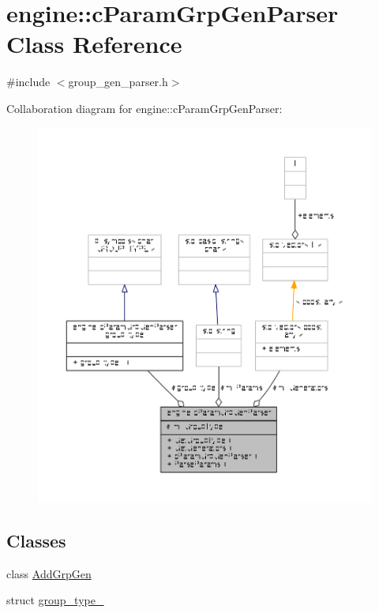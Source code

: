 \hypertarget{classengine_1_1cParamGrpGenParser}{\section{engine\-:\-:c\-Param\-Grp\-Gen\-Parser Class Reference}
\label{classengine_1_1cParamGrpGenParser}
}


{\ttfamily \#include $<$group\-\_\-gen\-\_\-parser.\-h$>$}



Collaboration diagram for engine\-:\-:c\-Param\-Grp\-Gen\-Parser\-:
\nopagebreak
\begin{figure}[H]
\begin{center}
\leavevmode
\includegraphics[width=350pt]{classengine_1_1cParamGrpGenParser__coll__graph}
\end{center}
\end{figure}
\subsection*{Classes}
\begin{DoxyCompactItemize}
\item 
class \hyperlink{classengine_1_1cParamGrpGenParser_1_1AddGrpGen}{Add\-Grp\-Gen}
\item 
struct \hyperlink{structengine_1_1cParamGrpGenParser_1_1group__type__}{group\-\_\-type\-\_\-}
\end{DoxyCompactItemize}
